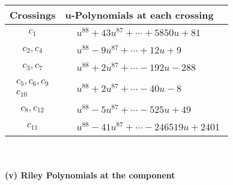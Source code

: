 \documentclass[1p]{elsarticle_modified}
\theoremstyle{definition}
\begin{document}
\begin{tabular}{m{50pt}|m{274pt}}
Crossings & \hspace{64pt}u-Polynomials at each crossing \\
\hline $$\begin{aligned}c_{1}\end{aligned}$$&$\begin{aligned}
&u^{88}+43 u^{87}+\cdots+5850 u+81
\end{aligned}$\\
\hline $$\begin{aligned}c_{2},c_{4}\end{aligned}$$&$\begin{aligned}
&u^{88}-9 u^{87}+\cdots+12 u+9
\end{aligned}$\\
\hline $$\begin{aligned}c_{3},c_{7}\end{aligned}$$&$\begin{aligned}
&u^{88}+2 u^{87}+\cdots-192 u-288
\end{aligned}$\\
\hline $$\begin{aligned}c_{5},c_{6},c_{9}\\c_{10}\end{aligned}$$&$\begin{aligned}
&u^{88}+2 u^{87}+\cdots-40 u-8
\end{aligned}$\\
\hline $$\begin{aligned}c_{8},c_{12}\end{aligned}$$&$\begin{aligned}
&u^{88}-5 u^{87}+\cdots-525 u+49
\end{aligned}$\\
\hline $$\begin{aligned}c_{11}\end{aligned}$$&$\begin{aligned}
&u^{88}-41 u^{87}+\cdots-246519 u+2401
\end{aligned}$\\
\hline
\end{tabular}\\~\\
\newpage\renewcommand{\arraystretch}{1}
\flushleft \textbf{(v) Riley Polynomials at the component}\newline \\
\end{document}

